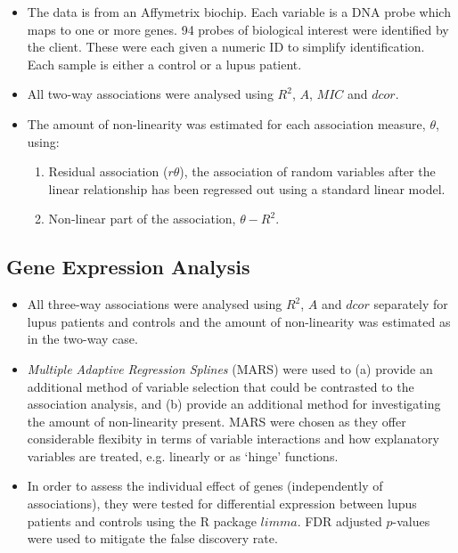 \documentclass[a4paper, landscape, 20pt]{extreport}
\begin{document}
\begin{itemize}
\item The data is from an Affymetrix biochip. Each variable is a DNA probe which maps to one or more genes. 94 probes of biological interest were identified by the client. These were each given a numeric ID to simplify identification. Each sample is either a control or a lupus patient.

\item All two-way associations were analysed using $R^2$, $A$, $MIC$ and $dcor$.

\item The amount of non-linearity was estimated for each association measure, $\theta$, using:
	\begin{enumerate}
	\item Residual association ($r \theta$), the association of random variables after the linear relationship has been regressed out using a standard linear model. 
	\item Non-linear part of the association, $\theta - R^2$.
	\end{enumerate}
\end{itemize}

\subsection*{\color{Blue} Gene Expression Analysis}

\begin{itemize}
\item All three-way associations were analysed using $R^2$, $A$ and $dcor$ separately for lupus patients and controls and the amount of non-linearity was estimated as in the two-way case.

\item \textit{Multiple Adaptive Regression Splines} (MARS) were used to (a) provide an additional method of variable selection that could be contrasted to the association analysis, and (b) provide an additional method for investigating the amount of non-linearity present. MARS were chosen as they offer considerable flexibity in terms of variable interactions and how explanatory variables are treated, e.g. linearly or as `hinge' functions.

\item In order to assess the individual effect of genes (independently of associations), they were tested for differential expression between lupus patients and controls using the R package $limma$. FDR adjusted $p$-values were used to mitigate the false discovery rate.
\end{itemize}
\end{document}
